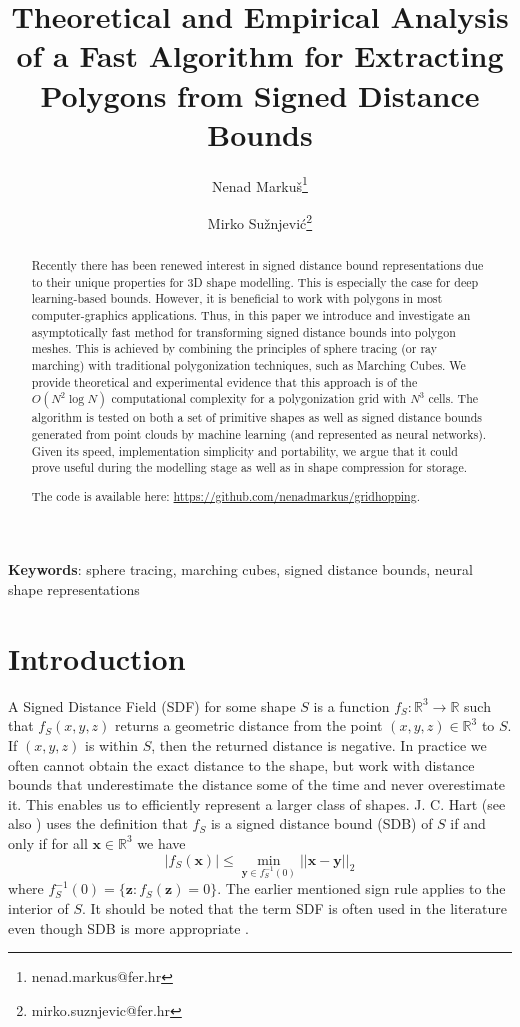 \documentclass[11pt,twocolumn]{article}
\title{Theoretical and Empirical Analysis of a Fast Algorithm for Extracting Polygons from Signed Distance Bounds}
\author{Nenad Marku\v{s}\thanks{nenad.markus@fer.hr}}
\author{Mirko Su\v{z}njevi\'{c}\thanks{mirko.suznjevic@fer.hr}}
\affil{University of Zagreb Faculty of Electrical Engineering and Computing\\Unska 3, 10000 Zagreb, Croatia}
\date{}
\begin{document}
	\maketitle

	\begin{abstract}
        Recently there has been renewed interest in signed distance bound representations due to their unique properties for 3D shape modelling.
        This is especially the case for deep learning-based bounds.
        However, it is beneficial to work with polygons in most computer-graphics applications.
		Thus, in this paper we introduce and investigate an asymptotically fast method for transforming signed distance bounds into polygon meshes.
		This is achieved by combining the principles of sphere tracing (or ray marching) with traditional polygonization techniques, such as Marching Cubes.
		We provide theoretical and experimental evidence that this approach is of the $O(N^2\log N)$ computational complexity for a polygonization grid with $N^3$ cells.
		The algorithm is tested on both a set of primitive shapes as well as signed distance bounds generated from point clouds by machine learning (and represented as neural networks).
		Given its speed, implementation simplicity and portability, we argue that it could prove useful during the modelling stage as well as in shape compression for storage.

		The code is available here: \url{https://github.com/nenadmarkus/gridhopping}.
	\end{abstract}

    \textbf{Keywords}: sphere tracing, marching cubes, signed distance bounds, neural shape representations

	\section{Introduction}
  		A Signed Distance Field (SDF) for some shape $S$ is a function $f_S:\mathbb{R}^3\rightarrow\mathbb{R}$ such that $f_S(x, y, z)$ returns a geometric distance from the point $(x, y, z)\in\mathbb{R}^3$ to $S$.
		If $(x, y, z)$ is within $S$, then the returned distance is negative.
		In practice we often cannot obtain the exact distance to the shape, but work with distance bounds that underestimate the distance some of the time and never overestimate it.
		This enables us to efficiently represent a larger class of shapes.
        J. C. Hart \cite{Hart94spheretracing} (see also \cite{HartEtAl89rtfractals}) uses the definition that $f_S$ is a signed distance bound (SDB) of $S$ if and only if for all $\mathbf{x}\in\mathbb{R}^3$ we have
		$$
			\vert f_S(\mathbf{x})\vert\leq
			\min_{\mathbf{y}\in f_S^{-1}(0)}\vert\vert\mathbf{x} - \mathbf{y}\vert\vert_2
		$$
		where $f_S^{-1}(0)=\{\mathbf{z}: f_S(\mathbf{z})=0\}$.
		The earlier mentioned sign rule applies to the interior of $S$.
        It should be noted that the term SDF is often used in the literature even though SDB is more appropriate \cite{Hart94spheretracing,HartEtAl89rtfractals}.
  
\end{document}
